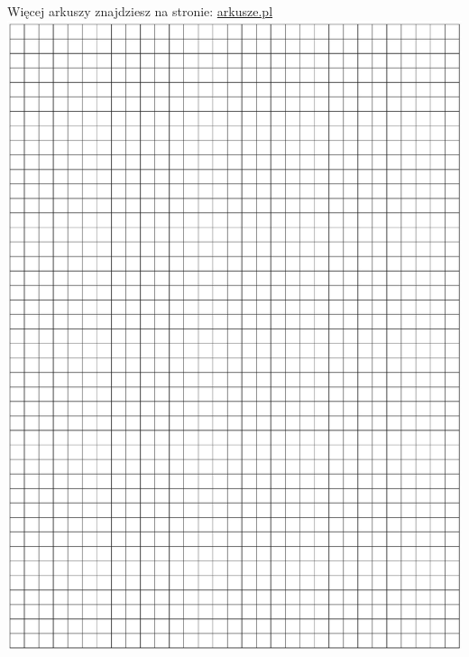 \documentclass[10pt]{article}
\begin{document}
Więcej arkuszy znajdziesz na stronie: \href{http://arkusze.pl}{arkusze.pl}\\
\includegraphics[max width=\textwidth, center]{2024_11_21_1e89351873aa60c4c1b9g-16}\\
\end{document}

